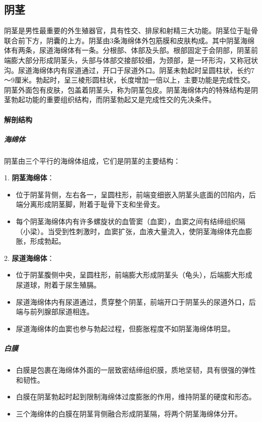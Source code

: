 \subsection{阴茎}

阴茎是男性最重要的外生殖器官，具有性交、排尿和射精三大功能。阴茎位于耻骨联合前下方，阴囊的上方。阴茎由3条海绵体外包筋膜和皮肤构成。其中阴茎海绵体有两条，尿道海绵体有一条。分根部、体部及头部。根部固定于会阴部，阴茎前端膨大部分形成阴茎头，头部与体部交接部较细，为颈部，是一环形沟，又称冠状沟。尿道海绵体内有尿道通过，开口于尿道外口。阴茎未勃起时呈圆柱状，长约7～9厘米。勃起时，呈三棱形圆柱状，长度增加一倍以上，主要功能是完成性交。阴茎外面包有皮肤，包盖着阴茎头，称为阴茎包皮。阴茎海绵体内的特殊结构是阴茎勃起功能的重要组织结构，而阴茎勃起又是完成性交的先决条件。

\paragraph{解剖结构}

\subparagraph{海绵体}
阴茎由三个平行的海绵体组成，它们是阴茎的主要结构：

1. \textbf{阴茎海绵体}：
  \begin{itemize}
  \item 位于阴茎背侧，左右各一，呈圆柱形，前端变细嵌入阴茎头底面的凹陷内，后端分离形成阴茎脚，附着于耻骨下支和坐骨支。
  \item 每个阴茎海绵体内有许多螺旋状的血管窦（血窦），血窦之间有结缔组织隔（小梁）。当受到性刺激时，血窦扩张，血液大量流入，使阴茎海绵体充血膨胀，形成勃起。
  \end{itemize}

2. \textbf{尿道海绵体}：
  \begin{itemize}
  \item 位于阴茎腹侧中央，呈圆柱形，前端膨大形成阴茎头（龟头），后端膨大形成尿道球，附着于尿生殖膈。
  \item 尿道海绵体内有尿道通过，贯穿整个阴茎，前端开口于阴茎头的尿道外口，后端与前列腺部尿道相连。
  \item 尿道海绵体的血窦也参与勃起过程，但膨胀程度不如阴茎海绵体明显。
  \end{itemize}

\subparagraph{白膜}
\begin{itemize}
\item 白膜是包裹在海绵体外面的一层致密结缔组织膜，质地坚韧，具有很强的弹性和韧性。
\item 白膜在阴茎勃起时起到限制海绵体过度膨胀的作用，维持阴茎的硬度和形态。
\item 三个海绵体的白膜在阴茎背侧融合形成阴茎隔，将两个阴茎海绵体分开。
\end{itemize}

